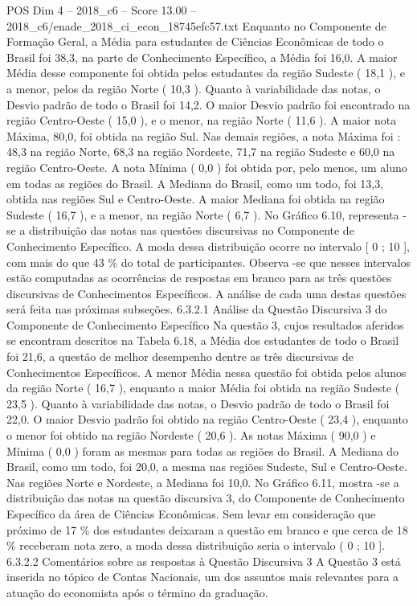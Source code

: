 \begin{textsample}{POS Dim 4 – 2018\_c6 – Score 13.00 – 2018\_c6/enade\_2018\_ci\_econ\_18745efc57.txt}
Enquanto no Componente de Formação Geral, a Média para estudantes de Ciências Econômicas de todo o Brasil foi 38,3, na parte de Conhecimento Específico, a Média foi 16,0.
A maior Média desse componente foi obtida pelos estudantes da região Sudeste ( 18,1 ), e a menor, pelos da região Norte ( 10,3 ).
Quanto à variabilidade das notas, o Desvio padrão de todo o Brasil foi 14,2.
O maior Desvio padrão foi encontrado na região Centro-Oeste ( 15,0 ), e o menor, na região Norte ( 11,6 ).
A maior nota Máxima, 80,0, foi obtida na região Sul.
Nas demais regiões, a nota Máxima foi : 48,3 na região Norte, 68,3 na região Nordeste, 71,7 na região Sudeste e 60,0 na região Centro-Oeste.
A nota Mínima ( 0,0 ) foi obtida por, pelo menos, um aluno em todas as regiões do Brasil.
A Mediana do Brasil, como um todo, foi 13,3, obtida nas regiões Sul e Centro-Oeste.
A maior Mediana foi obtida na região Sudeste ( 16,7 ), e a menor, na região Norte ( 6,7 ).
No Gráfico 6.10, representa -se a distribuição das notas nas questões discursivas no Componente de Conhecimento Específico.
A moda dessa distribuição ocorre no intervalo [ 0 ; 10 ], com mais do que 43 \% do total de participantes.
Observa -se que nesses intervalos estão computadas as ocorrências de respostas em branco para as três questões discursivas de Conhecimentos Específicos.
A análise de cada uma destas questões será feita nas próximas subseções. 6.3.2.1 Análise da Questão Discursiva 3 do Componente de Conhecimento Específico Na questão 3, cujos resultados aferidos se encontram descritos na Tabela 6.18, a Média dos estudantes de todo o Brasil foi 21,6, a questão de melhor desempenho dentre as três discursivas de Conhecimentos Específicos.
A menor Média nessa questão foi obtida pelos alunos da região Norte ( 16,7 ), enquanto a maior Média foi obtida na região Sudeste ( 23,5 ).
Quanto à variabilidade das notas, o Desvio padrão de todo o Brasil foi 22,0.
O maior Desvio padrão foi obtido na região Centro-Oeste ( 23,4 ), enquanto o menor foi obtido na região Nordeste ( 20,6 ).
As notas Máxima ( 90,0 ) e Mínima ( 0,0 ) foram as mesmas para todas as regiões do Brasil.
A Mediana do Brasil, como um todo, foi 20,0, a mesma nas regiões Sudeste, Sul e Centro-Oeste.
Nas regiões Norte e Nordeste, a Mediana foi 10,0.
No Gráfico 6.11, mostra -se a distribuição das notas na questão discursiva 3, do Componente de Conhecimento Específico da área de Ciências Econômicas.
Sem levar em consideração que próximo de 17 \% dos estudantes deixaram a questão em branco e que cerca de 18 \% receberam nota zero, a moda dessa distribuição seria o intervalo ( 0 ; 10 ]. 6.3.2.2 Comentários sobre as respostas à Questão Discursiva 3 A Questão 3 está inserida no tópico de Contas Nacionais, um dos assuntos mais relevantes para a atuação do economista após o término da graduação.

\end{textsample}
